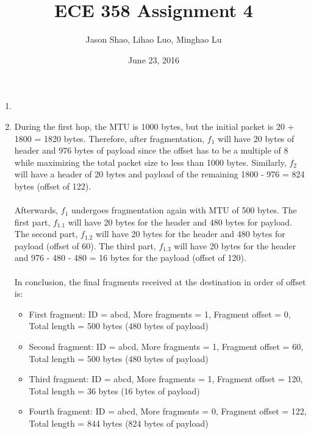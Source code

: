 \documentclass[12pt]{article}
\title{ECE 358 Assignment 4}
\author{Jason Shao, Lihao Luo, Minghao Lu}
\date{June 23, 2016}
\begin{document}
\maketitle
\renewcommand{\thesubsection}{Problem \arabic{subsection}}


\def\question#1{\item[\bf #1.]}
\def\part#1{\item[\bf #1)]}
\newcommand{\pc}[1]{\mbox{\textbf{#1}}} %

\begin{enumerate}
	\item %
	\item %
	During the first hop, the MTU is 1000 bytes, but the initial packet is 20 + 1800 = 1820 bytes. Therefore, after fragmentation, $f_1$ will have 20 bytes of header and 976 bytes of payload since the offset has to be a multiple of 8 while maximizing the total packet size to less than 1000 bytes.  Similarly, $f_2$ will have a header of 20 bytes and payload of the remaining 1800 - 976 = 824 bytes (offset of 122). \\ \\ Afterwards, $f_1$ undergoes fragmentation again with MTU of 500 bytes. The first part, $f_1.1$ will have 20 bytes for the header and 480 bytes for payload. The second part, $f_1.2$ will have 20 bytes for the header and 480 bytes for payload (offset of 60). The third part, $f_1.3$ will have 20 bytes for the header and 976 - 480 - 480 = 16 bytes for the payload (offset of 120). \\ \\ In conclusion, the final fragments received at the destination in order of offset is:
	\begin{itemize}
		\item First fragment: ID = abcd, More fragments = 1, Fragment offset = 0, Total length = 500 bytes (480 bytes of payload)
		\item Second fragment: ID = abcd, More fragments = 1, Fragment offset = 60, Total length = 500 bytes (480 bytes of payload)
		\item Third fragment: ID = abcd, More fragments = 1, Fragment offset = 120, Total length = 36 bytes (16 bytes of payload)
		\item Fourth fragment: ID = abcd, More fragments = 0, Fragment offset = 122, Total length = 844 bytes (824 bytes of payload)

\end{itemize}
\end{enumerate}
\end{document}
